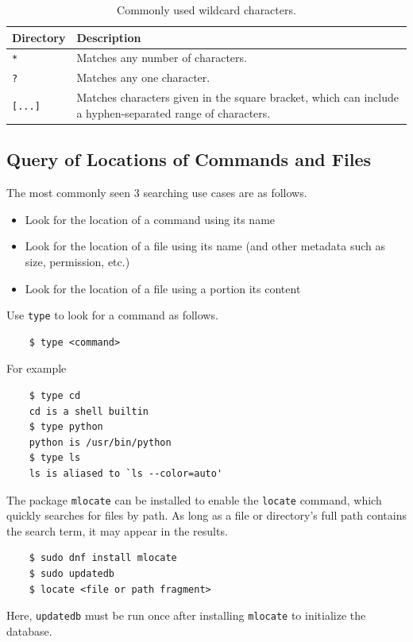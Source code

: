 \begin{table}[!htb]
	\centering \caption{Commonly used wildcard characters.}\label{ch:fm:tab:metacharacters}
	\begin{tabularx}{\textwidth}{lX}
		\hline
		Directory & Description \\ \hline
		\verb|*| & Matches any number of characters. \\ 
		\verb|?| & Matches any one character. \\ 
		\verb|[...]| & Matches characters given in the square bracket, which can include a hyphen-separated range of characters. \\
		\hline
	\end{tabularx}
\end{table}

\subsection{Query of Locations of Commands and Files}

The most commonly seen 3 searching use cases are as follows.
\begin{itemize}
	\item Look for the location of a command using its name
	\item Look for the location of a file using its name (and other metadata such as size, permission, etc.)
	\item Look for the location of a file using a portion its content
\end{itemize}

Use \verb|type| to look for a command as follows.
\begin{lstlisting}
	$ type <command>
\end{lstlisting}

For example
\begin{lstlisting}
	$ type cd
	cd is a shell builtin
	$ type python
	python is /usr/bin/python
	$ type ls
	ls is aliased to `ls --color=auto'
\end{lstlisting}

The package \verb|mlocate| can be installed to enable the \verb|locate| command, which quickly searches for files by path. As long as a file or directory’s full path contains the search term, it may appear in the results.
\begin{lstlisting}
	$ sudo dnf install mlocate
	$ sudo updatedb
	$ locate <file or path fragment>
\end{lstlisting}
Here, \verb|updatedb| must be run once after installing \verb|mlocate| to initialize the database.

